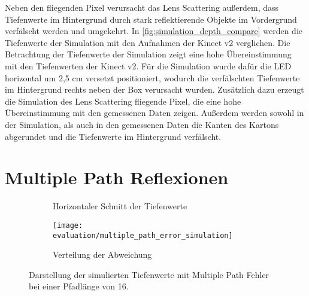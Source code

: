 \documentclass[thesis.tex]{subfiles}
\begin{document}
Neben den fliegenden Pixel verursacht das Lens Scattering außerdem, dass Tiefenwerte im Hintergrund durch stark reflektierende Objekte im Vordergrund verfälscht werden und umgekehrt. In \autoref{fig:simulation_depth_compare} werden die Tiefenwerte der Simulation mit den Aufnahmen der Kinect v2 verglichen. Die Betrachtung der Tiefenwerte der Simulation zeigt eine hohe Übereinstimmung mit den Tiefenwerten der Kinect v2. Für die Simulation wurde dafür die LED horizontal um 2,5 cm versetzt positioniert, wodurch die verfälschten Tiefenwerte im Hintergrund rechts neben der Box verursacht wurden. Zusätzlich dazu erzeugt die Simulation des Lens Scattering fliegende Pixel, die eine hohe Übereinstimmung mit den gemessenen Daten zeigen. Außerdem werden sowohl in der Simulation, als auch in den gemessenen Daten die Kanten des Kartons abgerundet und die Tiefenwerte im Hintergrund verfälscht.

\section{Multiple Path Reflexionen}

\begin{figure}[h!]
\centering
\begin{subfigure}[b]{0.98\textwidth}
    \centering
\end{subfigure}
\vspace{5mm}
\begin{subfigure}{0.49\textwidth}
\caption{Horizontaler Schnitt der Tiefenwerte}
\end{subfigure}
\begin{subfigure}{0.49\textwidth}
    \texttt{[image: evaluation/multiple\_path\_error\_simulation]}
    \caption{Verteilung der Abweichung}
\label{fig:multiple_path_error_simulation_depth}
\end{subfigure}
    \caption{Darstellung der simulierten Tiefenwerte mit Multiple Path Fehler bei einer Pfadlänge von 16.}
    \label{fig:multiple_path_error_simulation_depth_jetmap}
\end{figure}
\end{document}
